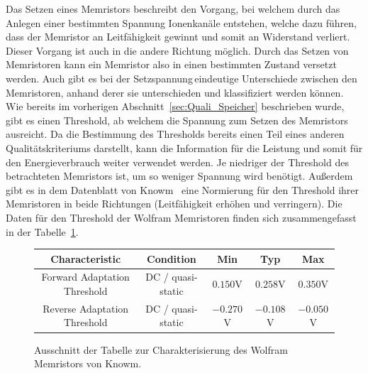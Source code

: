   Das Setzen eines Memristors beschreibt den Vorgang, bei welchem durch das Anlegen einer bestimmten Spannung Ionenkanäle entstehen, welche dazu führen, dass der Memristor an Leitfähigkeit gewinnt und somit an Widerstand verliert. Dieser Vorgang ist auch in die andere Richtung möglich. Durch das Setzen von Memristoren kann ein Memristor also in einen bestimmten Zustand versetzt werden. Auch gibt es bei der \glqq Setzspannung\grqq\,eindeutige Unterschiede zwischen den Memristoren, anhand derer sie unterschieden und klassifiziert werden können. Wie bereits im vorherigen Abschnitt~\ref{sec:Quali_Speicher} beschrieben wurde, gibt es einen Threshold, ab welchem die Spannung zum Setzen des Memristors ausreicht. Da die Bestimmung des Thresholds bereits einen Teil eines anderen Qualitätskriteriums darstellt, kann die Information für die Leistung und somit für den Energieverbrauch weiter verwendet werden. Je niedriger der Threshold des betrachteten Memristors ist, um so weniger Spannung wird benötigt. Außerdem gibt es in dem Datenblatt von Knowm~\cite{knowm_comp_2019} eine Normierung für den Threshold ihrer Memristoren in beide Richtungen (Leitfähigkeit erhöhen und verringern). Die Daten für den Threshold der Wolfram Memristoren finden sich zusammengefasst in der Tabelle~\ref{tab:Threshold}.

  \begin{figure}
    \begin{tabular}{|c|c|c|c|c|}
      \hline
      \textbf{Characteristic} & \textbf{Condition} & \textbf{Min} & \textbf{Typ} & \textbf{Max} \\\hline
      Forward Adaptation Threshold & DC / quasi-static & $0.150$V & $0.258$V & $0.350$V \\\hline
      Reverse Adaptation Threshold & DC / quasi-static & $-0.270$V & $-0.108$V & $-0.050$V\\\hline
    \end{tabular}
    \caption{Ausschnitt der Tabelle zur Charakterisierung des Wolfram Memristors von Knowm.}
    \label{tab:Threshold}
  \end{figure}

